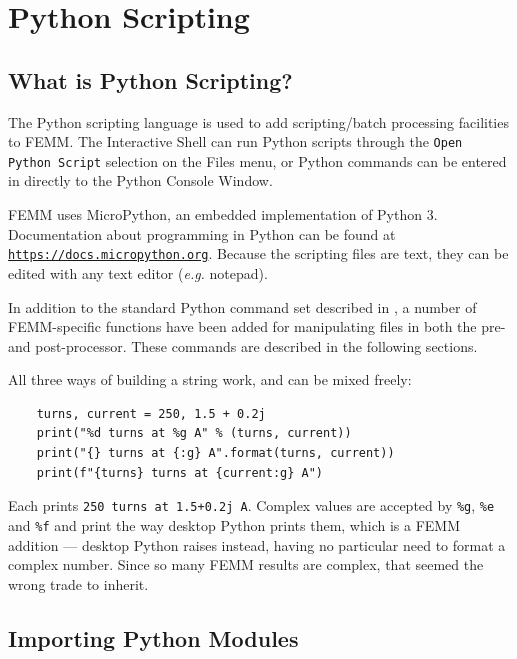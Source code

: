 
\chapter{Python Scripting}

\section{What is Python Scripting?}

The Python scripting language is used to add scripting/batch
processing facilities to FEMM. The Interactive Shell can run Python scripts
through the {\tt Open Python Script} selection on the Files menu, or Python commands can be
entered in directly to the Python Console Window.

FEMM uses MicroPython, an embedded implementation of Python 3.
Documentation about programming in Python can be found at
\href{https://docs.micropython.org}{\tt https://docs.micropython.org}. 
Because the
scripting files are text, they can be edited with any text editor
({\em e.g.} notepad).

In addition to the standard Python command set described in \cite{micropythondoc}, a number of
FEMM-specific functions have been added for manipulating files in
both the pre- and post-processor.  These commands are described in
the following sections.

All three ways of building a string work, and can be mixed freely:

\begin{verbatim}
    turns, current = 250, 1.5 + 0.2j
    print("%d turns at %g A" % (turns, current))
    print("{} turns at {:g} A".format(turns, current))
    print(f"{turns} turns at {current:g} A")
\end{verbatim}

\noindent
Each prints {\tt 250 turns at 1.5+0.2j A}.  Complex values are accepted by
{\tt \%g}, {\tt \%e} and {\tt \%f} and print the way desktop Python prints
them, which is a FEMM addition --- desktop Python raises instead, having no
particular need to format a complex number.  Since so many FEMM results are
complex, that seemed the wrong trade to inherit.

\section{Importing Python Modules}

